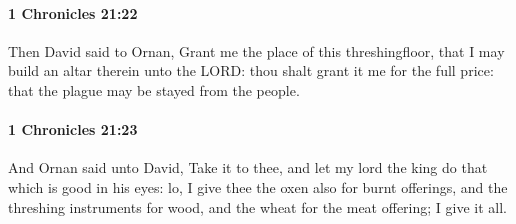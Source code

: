 		\paragraph{1 Chronicles 21:22} %
			\label{1CHRONICLES-21-22}

			Then David said to Ornan, Grant me the place of this threshingfloor, that I may build an altar therein unto the LORD: thou shalt grant it me for the full price: that the plague may be stayed from the people.


		\paragraph{1 Chronicles 21:23} %
			\label{1CHRONICLES-21-23}

			And Ornan said unto David, Take it to thee, and let my lord the king do that which is good in his eyes: lo, I give thee the oxen also for burnt offerings, and the threshing instruments for wood, and the wheat for the meat offering; I give it all.

